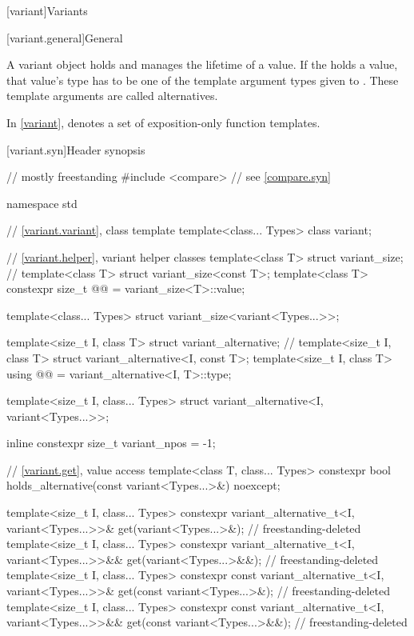 [variant]{Variants}

[variant.general]{General}

\pnum
A variant object holds and manages the lifetime of a value.
If the  holds a value, that value's type has to be one
of the template argument types given to .
These template arguments are called alternatives.

\pnum
In \ref{variant},
 denotes
a set of exposition-only function templates.

[variant.syn]{Header  synopsis}
%

\begin{codeblock}
// mostly freestanding
#include <compare>              // see \ref{compare.syn}

namespace std {
  // \ref{variant.variant}, class template 
  template<class... Types>
    class variant;

  // \ref{variant.helper}, variant helper classes
  template<class T> struct variant_size;                        // \notdef
  template<class T> struct variant_size<const T>;
  template<class T>
    constexpr size_t @@ = variant_size<T>::value;

  template<class... Types>
    struct variant_size<variant<Types...>>;

  template<size_t I, class T> struct variant_alternative;       // \notdef
  template<size_t I, class T> struct variant_alternative<I, const T>;
  template<size_t I, class T>
    using @@ = variant_alternative<I, T>::type;

  template<size_t I, class... Types>
    struct variant_alternative<I, variant<Types...>>;

  inline constexpr size_t variant_npos = -1;

  // \ref{variant.get}, value access
  template<class T, class... Types>
    constexpr bool holds_alternative(const variant<Types...>&) noexcept;

  template<size_t I, class... Types>
    constexpr variant_alternative_t<I, variant<Types...>>&
      get(variant<Types...>&);                                          // freestanding-deleted
  template<size_t I, class... Types>
    constexpr variant_alternative_t<I, variant<Types...>>&&
      get(variant<Types...>&&);                                         // freestanding-deleted
  template<size_t I, class... Types>
    constexpr const variant_alternative_t<I, variant<Types...>>&
      get(const variant<Types...>&);                                    // freestanding-deleted
  template<size_t I, class... Types>
    constexpr const variant_alternative_t<I, variant<Types...>>&&
      get(const variant<Types...>&&);                                   // freestanding-deleted

}
\end{codeblock}
